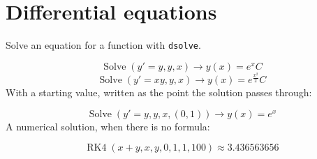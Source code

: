 \documentclass[11pt,a4paper]{article}
\theoremstyle{plain}
\theoremstyle{definition}
\theoremstyle{remark}
\begin{document}
\section*{Differential equations}

Solve an equation for a function with \texttt{dsolve}.

\begin{equation*}
  \operatorname{Solve}(y' = y, y, x) \to y\left(x\right) = e^{x} C
\end{equation*}
\begin{equation*}
  \operatorname{Solve}(y' = x y, y, x) \to y\left(x\right) = e^{\frac{x^{2}}{2}} C
\end{equation*}
With a starting value, written as the point the solution passes through:

\begin{equation*}
  \operatorname{Solve}(y' = y, y, x, (0, 1)) \to y\left(x\right) = e^{x}
\end{equation*}
A numerical solution, when there is no formula:

\begin{equation*}
  \operatorname{RK4}(x + y, x, y, 0, 1, 1, 100) \approx 3.436563656
\end{equation*}
\end{document}
